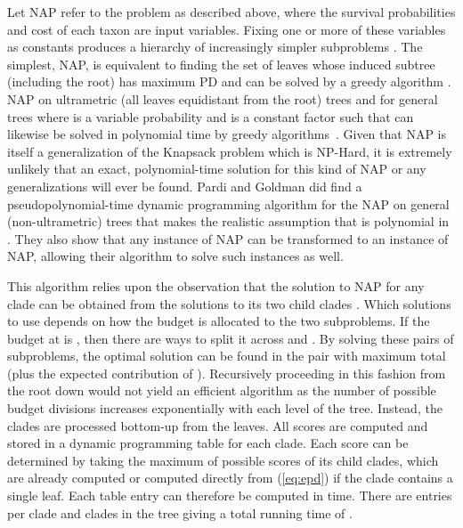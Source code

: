\documentclass[10pt]{llncs}       \usepackage{graphicx,subfigure}
\begin{document}
Let  NAP refer to the problem as described above,
where the survival probabilities and cost of each taxon are input variables.
Fixing one or more of these variables as constants 
produces a hierarchy of increasingly
simpler subproblems \cite{pardi07}.  The simplest,  NAP, 
is equivalent to finding the set of  leaves whose induced subtree 
(including the root) has maximum PD and can be solved by a greedy
algorithm \cite{steel05} \cite{pardi05}.  NAP on
ultrametric (all leaves equidistant from the root)
 trees and  for general
trees where  is a variable probability and  is a 
constant factor such that  can likewise be 
solved in polynomial time by greedy algorithms~\cite{hartmann06}. 
Given that  NAP is itself a generalization
of the Knapsack problem which is NP-Hard, it is extremely unlikely that
an exact, polynomial-time solution for this kind of NAP or any generalizations
will ever be found.
Pardi and Goldman 
\cite{pardi07} did find a pseudopolynomial-time dynamic programming
algorithm for 
the  NAP on general (non-ultrametric) trees
that makes the realistic assumption that  is polynomial in .
They
also show that any instance of  NAP can be
transformed to an instance of  NAP, allowing 
their algorithm to solve such instances as well.

This algorithm
 relies upon the observation that the solution to 
 NAP for any clade can be obtained from the solutions
to its two child clades \cite{pardi07}.  Which solutions to use depends on
how the budget is allocated to the two subproblems.  If the budget
at  is , 
then there are  ways to split it across  and 
.  
By solving these 
pairs of subproblems, the optimal solution can be found in the pair
with maximum total  
(plus the expected contribution of ).  Recursively proceeding in this 
fashion from the root down
would not yield an efficient algorithm as the number of possible
budget divisions increases exponentially with each level of the tree.
Instead, the clades are processed bottom-up from the leaves.  All 
scores are computed and stored in a dynamic programming table for each clade.
Each score can be determined by taking the maximum of  possible 
scores of its child clades, which are already computed or computed directly
from (\ref{eq:epd}) if the clade contains a single leaf.  Each table entry can 
therefore be 
computed in  time.  There are  entries per clade and 
clades in the tree giving a total running time of .
\end{document}
